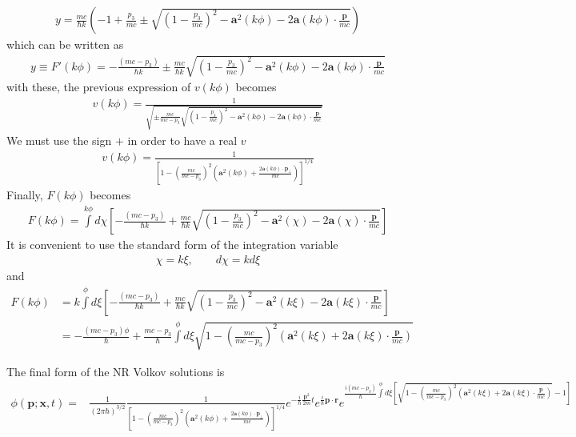 \begin{align}
    y = \frac{mc}{\hbar k}\left(-1+\frac{p_3}{mc}\pm\sqrt{\left(1-\frac{p_3}{mc}\right)^2-{\bm a}^2(k\phi)-2{\bm a}(k\phi)\cdot\frac{\bm p}{mc}}\right)
\end{align}
which can be written as
\begin{align}
    y\equiv F'(k\phi)=-\frac{(mc-p_3)}{\hbar k}\pm\frac{mc}{\hbar k}\sqrt{\left(1-\frac{p_3}{mc}\right)^2-{\bm a}^2(k\phi)-2{\bm a}(k\phi)\cdot\frac{\bm p}{mc}}
\end{align}
with these, the previous expression of $v(k\phi)$ becomes
\begin{align}
    v(k\phi)=\frac1{\sqrt{\pm\frac{mc}{mc-p_3}\sqrt{\left(1-\frac{p_3}{mc}\right)^2-{\bm a}^2(k\phi)-2{\bm a}(k\phi)\cdot\frac{\bm p}{mc}}}}
\end{align}
We must use the sign $+$ in order to have a real $v$
\begin{align}
    v(k\phi)=\frac1{\left[1-\left(\frac{mc}{mc-p_3}\right)^2\left({\bm a}^2(k\phi)+\frac{2{\bm a}(k\phi)\cdot{\bm p}_\perp}{mc}\right)\right]^{1/4}}
\end{align}
Finally, $F(k\phi)$ becomes
\begin{align}
    F(k\phi)=\int\limits^{k\phi}{d\chi\left[-\frac{(mc-p_3)}{\hbar k}+\frac{mc}{\hbar k}\sqrt{\left(1-\frac{p_3}{mc}\right)^2-{\bm a}^2(\chi)-2{\bm a}(\chi)\cdot\frac{{\bm p}}{mc}}\right]}
\end{align}
It is convenient to use the standard form of the integration variable
\begin{align}
    \chi = k\xi, \qquad d\chi=kd\xi
\end{align}
and
\begin{align}
    F(k\phi) & =k\int\limits^{\phi}{d\xi\left[-\frac{(mc-p_3)}{\hbar k}+\frac{mc}{\hbar k}\sqrt{\left(1-\frac{p_3}{mc}\right)^2-{\bm a}^2(k\xi)-2{\bm a}(k\xi)\cdot\frac{\bm p}{mc}}\right]}\nonumber \\
             & =-\frac{(mc-p_3)\phi}{\hbar}+\frac{mc-p_3}{\hbar}\int\limits^{\phi}d\xi\sqrt{1-\left(\frac{mc}{mc-p_3}\right)^2\left({\bm a}^2(k\xi)+2{\bm a}(k\xi)\cdot\frac{\bm p}{mc}\right)}
\end{align}

The final form of the NR Volkov solutions is
\begin{align}
    \phi({\bm p};{\bm x},t)= & \frac1{(2\pi\hbar)^{3/2}}\frac1{\left[1-\left(\frac{mc}{mc-p_3}\right)^2\left({\bm a}^2(k\phi)+\frac{2{\bm a}(k\phi)\cdot{\bm p}_\perp}{mc}\right)\right]^{1/4}}e^{-\frac{i}{\hbar}\frac{{\bm p}^2}{2m}t}e^{\frac{i}{\hbar}{\bm p}\cdot{\bm r}}
    e^{\frac{i(mc-p_3)}{\hbar}\int\limits^{\phi}d\xi\left[\sqrt{1-\left(\frac{mc}{mc-p_3}\right)^2\left({\bm a}^2(k\xi)+2{\bm a}(k\xi)\cdot\frac{\bm p}{mc}\right)}-1\right]}
\end{align}

